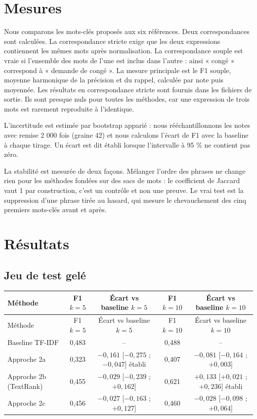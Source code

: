 \documentclass[11pt,a4paper]{article}
\begin{document}
\section{Mesures}

Nous comparons les mots-clés proposés aux six références. Deux correspondances sont calculées. La correspondance stricte exige que les deux expressions contiennent les mêmes mots après normalisation. La correspondance souple est vraie si l'ensemble des mots de l'une est inclus dans l'autre : ainsi « congé » correspond à « demande de congé ». La mesure principale est le F1 souple, moyenne harmonique de la précision et du rappel, calculée par note puis moyennée. Les résultats en correspondance stricte sont fournis dans les fichiers de sortie. Ils sont presque nuls pour toutes les méthodes, car une expression de trois mots est rarement reproduite à l'identique.

L'incertitude est estimée par bootstrap apparié : nous rééchantillonnons les notes avec remise 2 000 fois (graine 42) et nous calculons l'écart de F1 avec la baseline à chaque tirage. Un écart est dit établi lorsque l'intervalle à 95 \% ne contient pas zéro.

La stabilité est mesurée de deux façons. Mélanger l'ordre des phrases ne change rien pour les méthodes fondées sur des sacs de mots : le coefficient de Jaccard vaut 1 par construction, c'est un contrôle et non une preuve. Le vrai test est la suppression d'une phrase tirée au hasard, qui mesure le chevauchement des cinq premiers mots-clés avant et après.

\section{Résultats}

\subsection{Jeu de test gelé}

{\small\begin{longtable}{lcccc}
\toprule
Méthode & F1 $k=5$ & Écart vs baseline $k=5$ & F1 $k=10$ & Écart vs baseline $k=10$ \\
\midrule
\endfirsthead
\toprule
Méthode & F1 $k=5$ & Écart vs baseline $k=5$ & F1 $k=10$ & Écart vs baseline $k=10$ \\
\midrule
\endhead
Baseline TF-IDF & 0,483 & -- & 0,488 & -- \\
Approche 2a & 0,323 & $-0,161$ [$-0,275$ ; $-0,047$] établi & 0,407 & $-0,081$ [$-0,164$ ; $+0,003$] \\
Approche 2b (TextRank) & 0,455 & $-0,029$ [$-0,239$ ; $+0,162$] & 0,621 & $+0,133$ [$+0,021$ ; $+0,236$] établi \\
Approche 2c & 0,456 & $-0,027$ [$-0,163$ ; $+0,127$] & 0,460 & $-0,028$ [$-0,098$ ; $+0,064$] \\
\bottomrule
\end{longtable}}
\end{document}

